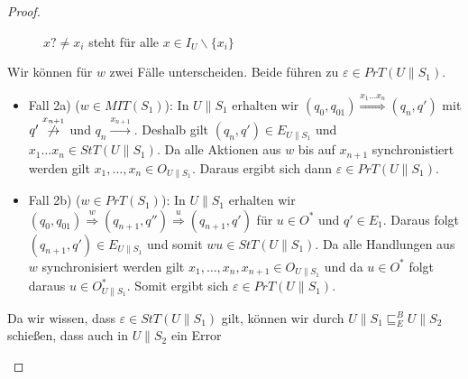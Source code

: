 \begin{proof}
\begin{itemize}
\begin{figure} [h!tbp]
\begin{center}
        \caption{$x?\neq x_i$ steht für alle $x\in I_U\backslash\{x_i\}$}
        \label{UohneE}
      \end{center}
      \end{figure}
      Wir können für $w$ zwei Fälle unterscheiden. Beide führen zu
      $\varepsilon\in PrT(U\|S_1)$.
      \begin{itemize}
        \item Fall 2a) ($w\in MIT(S_1)$): In $U\|S_1$ erhalten wir
          $(q_0,q_{01}) \overset{x_1\dots x_n}{\Rightarrow} (q_n,q')$ mit
          $q' \overset{x_{n+1}}{\not{\hspace{-0.1cm}\rightarrow}}$ und $q_n
          \overset{x_{n+1}}{\rightarrow}$. Deshalb gilt $(q_n,q')\in
          E_{U\|S_1}$ und $x_1\dots x_n\in StT(U\|S_1)$. Da alle Aktionen aus
          $w$ bis auf $x_{n+1}$ synchronistiert werden gilt $x_1,\dots ,x_n\in
          O_{U\|S_1}$. Daraus ergibt sich dann $\varepsilon\in PrT(U\|S_1)$.
        \item Fall 2b) ($w\in PrT(S_1)$): In $U\|S_1$ erhalten wir
          $(q_0,q_{01}) \overset{w}{\Rightarrow} (q_{n+1},q'')
          \overset{u}{\Rightarrow} (q_{n+1},q')$ für $u\in O^*$ und $q'\in
          E_1$. Daraus folgt $(q_{n+1},q')\in E_{U\|S_1}$ und somit $wu\in
          StT(U\|S_1)$. Da alle Handlungen aus $w$ synchronisiert werden gilt
          $x_1,\dots ,x_n,x_{n+1}\in O_{U\|S_1}$ und da $u\in O^*$ folgt
          daraus $u\in O_{U\|S_1}^*$. Somit ergibt sich $\varepsilon\in
          PrT(U\|S_1)$.
      \end{itemize}
      Da wir wissen, dass $\varepsilon\in StT(U\|S_1)$ gilt, können wir durch
      $U\|S_1\sqsubseteq _E^B U\|S_2$ schießen, dass auch in $U\|S_2$ ein Error

\end{itemize}
\end{proof}
